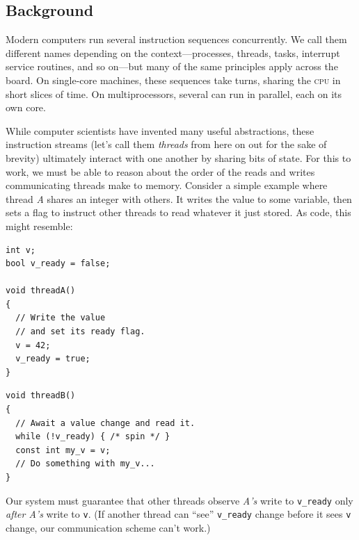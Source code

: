 \documentclass[fontsize=10pt, numbers=endperiod]{scrartcl}
\newcommand{\codesize}{\fontsize{10pt}{12pt}}
\newenvironment{colfigure}
  {\par\vspace{1\baselineskip minus 0.5\baselineskip}\noindent\minipage{\linewidth}}
  {\endminipage\vspace*{1\baselineskip minus 0.7\baselineskip}}
\begin{document}
\begin{multicols*}{2}
\section{Background}
\label{background}

Modern computers run several instruction sequences concurrently.
We call them different names depending on the context---processes, threads, tasks,
interrupt service routines, and so on---but many of the same principles apply
across the board.
On single-core machines, these sequences take turns,
sharing the \textsc{cpu} in short slices of time.
On multiprocessors, several can run in parallel, each on its own core.

While computer scientists have invented many useful abstractions,
these instruction streams (let's call them \emph{threads} from here on out for
the sake of brevity) ultimately interact with one another by sharing bits of state.
For this to work, we must be able to reason about
the order of the reads and writes communicating threads make to memory.
Consider a simple example where thread \textit{A} shares
an integer with others.
It writes the value to some variable,
then sets a flag to instruct other threads to read whatever it just stored.
As code, this might resemble:
\begin{colfigure}
\begin{verbatim}
int v;
bool v_ready = false;

void threadA()
{
  // Write the value
  // and set its ready flag.
  v = 42;
  v_ready = true;
}
\end{verbatim}
\end{colfigure}
\begin{colfigure}
\begin{verbatim}
void threadB()
{
  // Await a value change and read it.
  while (!v_ready) { /* spin */ }
  const int my_v = v;
  // Do something with my_v...
}
\end{verbatim}
\end{colfigure}
Our system must guarantee that other threads observe \textit{A's} write to
\texttt{v\_ready}
only \emph{after A's} write to \texttt{v}.
(If another thread can ``see'' \texttt{v\_ready} change before it sees \texttt{v}
change, our communication scheme can't work.)


\end{multicols*}
\end{document}
